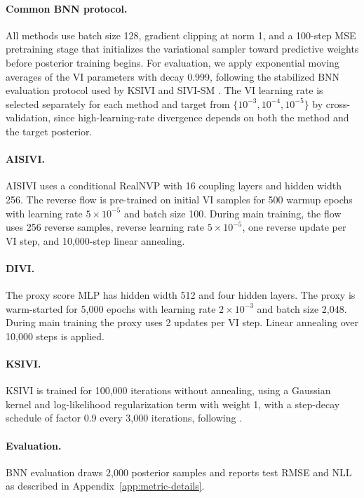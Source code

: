 \paragraph{Common BNN protocol.}
All methods use batch size 128, gradient clipping at norm 1, and a 100-step MSE pretraining stage that initializes the variational sampler toward predictive weights before posterior training begins.  For evaluation, we apply exponential moving averages of the VI parameters with decay 0.999, following the stabilized BNN evaluation protocol used by KSIVI and SIVI-SM \citep{cheng2024kernel,yu2023semi}.  The VI learning rate is selected separately for each method and target from $\{10^{-3}, 10^{-4}, 10^{-5}\}$ by cross-validation, since high-learning-rate divergence depends on both the method and the target posterior.

\paragraph{AISIVI.}
AISIVI uses a conditional RealNVP with 16 coupling layers and hidden width 256.  The reverse flow is pre-trained on initial VI samples for 500 warmup epochs with learning rate $5 \times 10^{-5}$ and batch size 100.  During main training, the flow uses 256 reverse samples, reverse learning rate $5 \times 10^{-5}$, one reverse update per VI step, and 10,000-step linear annealing.

\paragraph{DIVI.}
The proxy score MLP has hidden width 512 and four hidden layers.  The proxy is warm-started for 5,000 epochs with learning rate $2 \times 10^{-3}$ and batch size 2,048.  During main training the proxy uses 2 updates per VI step.  Linear annealing over 10,000 steps is applied.

\paragraph{KSIVI.}
KSIVI is trained for 100,000 iterations without annealing, using a Gaussian kernel and log-likelihood regularization term with weight 1, with a step-decay schedule of factor 0.9 every 3,000 iterations, following \citet{cheng2024kernel}.

\paragraph{Evaluation.}
BNN evaluation draws 2,000 posterior samples and reports test RMSE and NLL as described in Appendix~\ref{app:metric-details}.

